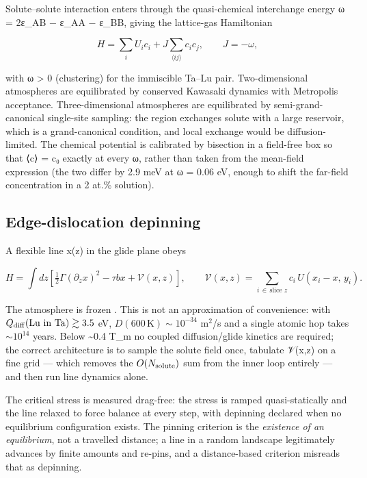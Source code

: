 \documentclass[11pt,a4paper]{article}
\begin{document}
Solute--solute interaction enters through the quasi-chemical interchange energy \cite{guggenheim1952} ω = 2ε\_AB − ε\_AA − ε\_BB, giving the lattice-gas Hamiltonian

\[H = \sum_i U_i c_i + J\sum_{\langle ij\rangle} c_i c_j,\qquad J = -\omega,\]

with ω \textgreater{} 0 (clustering) for the immiscible Ta--Lu pair. Two-dimensional atmospheres are equilibrated by conserved Kawasaki dynamics with Metropolis acceptance. Three-dimensional atmospheres are equilibrated by semi-grand-canonical single-site sampling: the region exchanges solute with a large reservoir, which is a grand-canonical condition, and local exchange would be diffusion-limited. The chemical potential is calibrated by bisection in a field-free box so that ⟨c⟩ = c₀ exactly at every ω, rather than taken from the mean-field expression (the two differ by 2.9 meV at ω = 0.06 eV, enough to shift the far-field concentration in a 2 at.\% solution).

\hypertarget{edge-dislocation-depinning}{%
\subsection{Edge-dislocation depinning}\label{sec:edge-dislocation-depinning}}

A flexible line x(z) in the glide plane obeys

\[H = \int\!dz\left[\tfrac12\Gamma(\partial_z x)^2 - \tau b x + \mathcal{V}(x,z)\right],\qquad \mathcal{V}(x,z) = \sum_{i\,\in\,\text{slice }z} c_i\,U(x_i - x,\,y_i).\]

The atmosphere is frozen \cite{cottrell1949}. This is not an approximation of convenience: with \(Q_{\rm diff}(\mathrm{Lu\ in\ Ta})\gtrsim3.5\) eV, \(D(600\,\mathrm{K})\sim10^{-34}\) m\(^2\)/s and a single atomic hop takes \(\sim10^{14}\) years. Below \textasciitilde0.4 T\_m no coupled diffusion/glide kinetics are required; the correct architecture is to sample the solute field once, tabulate 𝒱(x,z) on a fine grid --- which removes the \(O(N_{\rm solute})\) sum from the inner loop entirely --- and then run line dynamics alone.

The critical stress is measured drag-free: the stress is ramped quasi-statically and the line relaxed to force balance at every step, with depinning declared when no equilibrium configuration exists. The pinning criterion is the \emph{existence of an equilibrium}, not a travelled distance; a line in a random landscape legitimately advances by finite amounts and re-pins, and a distance-based criterion misreads that as depinning.
\end{document}
